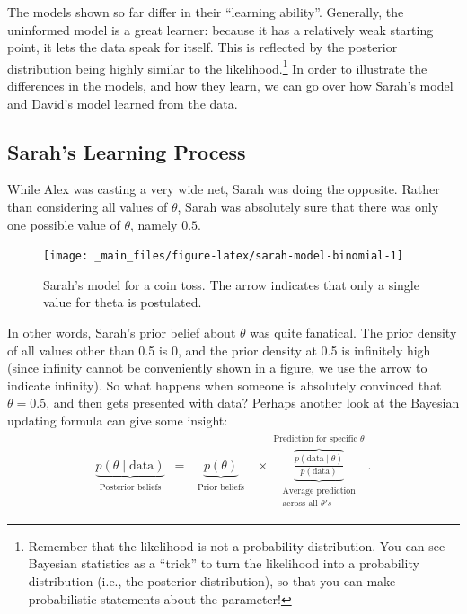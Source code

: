 \documentclass[
]{book}
\begin{document}
The models shown so far differ in their ``learning ability''. Generally, the uninformed model is a great learner: because it has a relatively weak starting point, it lets the data speak for itself. This is reflected by the posterior distribution being highly similar to the likelihood.\footnote{Remember that the likelihood is not a probability distribution. You can see Bayesian statistics as a ``trick'' to turn the likelihood into a probability distribution (i.e., the posterior distribution), so that you can make probabilistic statements about the parameter!} In order to illustrate the differences in the models, and how they learn, we can go over how Sarah's model and David's model learned from the data.

\hypertarget{sarahs-learning-process}{%
\subsection{Sarah's Learning Process}\label{sarahs-learning-process}}

While Alex was casting a very wide net, Sarah was doing the opposite. Rather than considering all values of \(\theta\), Sarah was absolutely sure that there was only one possible value of \(\theta\), namely \(0.5\).

\begin{figure}

{\centering \texttt{[image: \_main\_files/figure-latex/sarah-model-binomial-1]} 

}

\caption{Sarah's model for a coin toss. The arrow indicates that only a single value for theta is postulated.}\label{fig:sarah-model-binomial}
\end{figure}

In other words, Sarah's prior belief about \(\theta\) was quite fanatical. The prior density of all values other than 0.5 is 0, and the prior density at 0.5 is infinitely high (since infinity cannot be conveniently shown in a figure, we use the arrow to indicate infinity). So what happens when someone is absolutely convinced that \(\theta = 0.5\), and then gets presented with data? Perhaps another look at the Bayesian updating formula can give some insight:
\begin{align}
\underbrace{ p(\theta \mid \text{data})}_{\substack{\text{Posterior beliefs}}} \,\,\, = \,\,\,
\underbrace{ p(\theta)}_{\substack{\text{Prior beliefs} }}
\,\,\,\, \times
\overbrace{\underbrace{\frac{p( \text{data} \mid \theta)}{p( \text{data})}}}^{\substack{\text{Prediction for specific }\theta }}_{\substack{\text{Average prediction} \\\text{across all }  \theta's}}.
\end{align}
\end{document}
